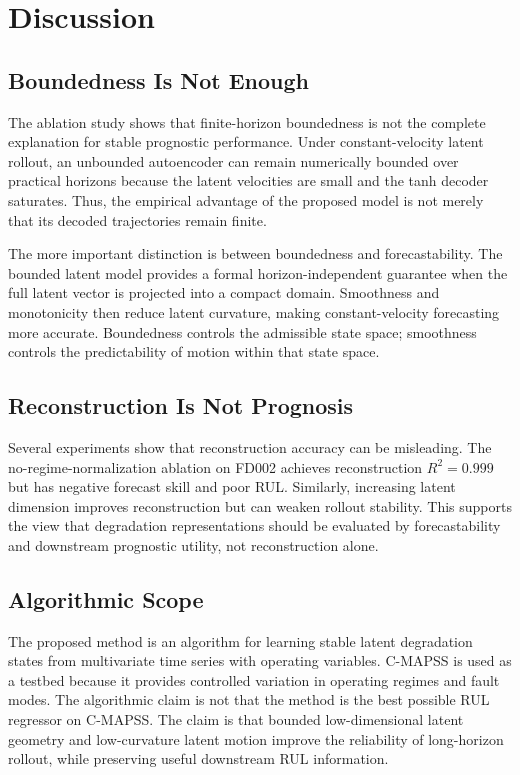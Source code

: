 \documentclass[a4paper,fleqn]{cas-sc}
\begin{document}
\section{Discussion}
\label{sec:discussion}

\subsection{Boundedness Is Not Enough}

The ablation study shows that finite-horizon boundedness is not the complete
explanation for stable prognostic performance. Under constant-velocity latent
rollout, an unbounded autoencoder can remain numerically bounded over
practical horizons because the latent velocities are small and the tanh decoder
saturates. Thus, the empirical advantage of the proposed model is not merely
that its decoded trajectories remain finite.

The more important distinction is between boundedness and forecastability. The
bounded latent model provides a formal horizon-independent guarantee when the
full latent vector is projected into a compact domain. Smoothness and
monotonicity then reduce latent curvature, making constant-velocity forecasting
more accurate. Boundedness controls the admissible state space; smoothness
controls the predictability of motion within that state space.

\subsection{Reconstruction Is Not Prognosis}

Several experiments show that reconstruction accuracy can be misleading. The
no-regime-normalization ablation on FD002 achieves reconstruction $R^2=0.999$
but has negative forecast skill and poor RUL. Similarly, increasing latent
dimension improves reconstruction but can weaken rollout stability. This
supports the view that degradation representations should be evaluated by
forecastability and downstream prognostic utility, not reconstruction alone.

\subsection{Algorithmic Scope}

The proposed method is an algorithm for learning stable latent degradation
states from multivariate time series with operating variables. C-MAPSS is used
as a testbed because it provides controlled variation in operating regimes and
fault modes. The algorithmic claim is not that the method is the best possible
RUL regressor on C-MAPSS. The claim is that bounded low-dimensional latent
geometry and low-curvature latent motion improve the reliability of
long-horizon rollout, while preserving useful downstream RUL information.
\end{document}
